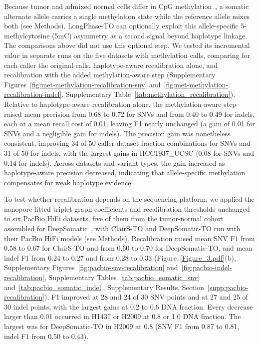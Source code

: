 \documentclass[unnumsec,webpdf,contemporary,large]{oup-authoring-template}
\begin{document}
Because tumor and admixed normal cells differ in CpG methylation~\cite{recillastarga2022,zheng2017,zhang2015}, a somatic alternate allele carries a single methylation state while the reference allele mixes both (see Methods). LongPhase-TO can optionally exploit this allele-specific 5-methylcytosine (5mC) asymmetry as a second signal beyond haplotype linkage. The comparisons above did not use this optional step. We tested its incremental value in separate runs on the five datasets with methylation calls, comparing for each caller the original calls, haplotype-aware recalibration alone, and recalibration with the added methylation-aware step (Supplementary Figures~\ref{fig:met-methylation-recalibration-snv} and~\ref{fig:met-methylation-recalibration-indel}, Supplementary Table~\ref{tab:methylation_recalibration}). Relative to haplotype-aware recalibration alone, the methylation-aware step raised mean precision from 0.68 to 0.72 for SNVs and from 0.40 to 0.49 for indels, each at a mean recall cost of 0.01, leaving F1 nearly unchanged (a gain of 0.01 for SNVs and a negligible gain for indels). The precision gain was nonetheless consistent, improving 34 of 50 caller-dataset-fraction combinations for SNVs and 31 of 50 for indels, with the largest gains in HCC1937\_UCSC (0.08 for SNVs and 0.14 for indels). Across datasets and variant types, the gain increased as haplotype-aware precision decreased, indicating that allele-specific methylation compensates for weak haplotype evidence.

To test whether recalibration depends on the sequencing platform, we applied the nanopore-fitted triplet-graph coefficients and recalibration thresholds unchanged to six PacBio HiFi datasets, five of them from the tumor-normal cohort assembled for DeepSomatic~\cite{park2024}, with ClairS-TO and DeepSomatic-TO run with their PacBio HiFi models (see Methods). Recalibration raised mean SNV F1 from 0.58 to 0.67 for ClairS-TO and from 0.60 to 0.70 for DeepSomatic-TO, and mean indel F1 from 0.24 to 0.27 and from 0.28 to 0.33 (Figure~\ref{Figure_3.pdf}(b), Supplementary Figures~\ref{fig:pacbio-snv-recalibration} and~\ref{fig:pacbio-indel-recalibration}, Supplementary Tables~\ref{tab:pacbio_somatic_snv} and~\ref{tab:pacbio_somatic_indel}, Supplementary Results, Section~\ref{supp:pacbio-recalibration}). F1 improved at 28 and 24 of 30 SNV points and at 27 and 25 of 30 indel points, with the largest gains at 0.2 to 0.6 DNA fraction. Every decrease larger than 0.01 occurred in H1437 or H2009 at 0.8 or 1.0 DNA fraction. The largest was for DeepSomatic-TO in H2009 at 0.8 (SNV F1 from 0.87 to 0.81, indel F1 from 0.50 to 0.43).
\end{document}
